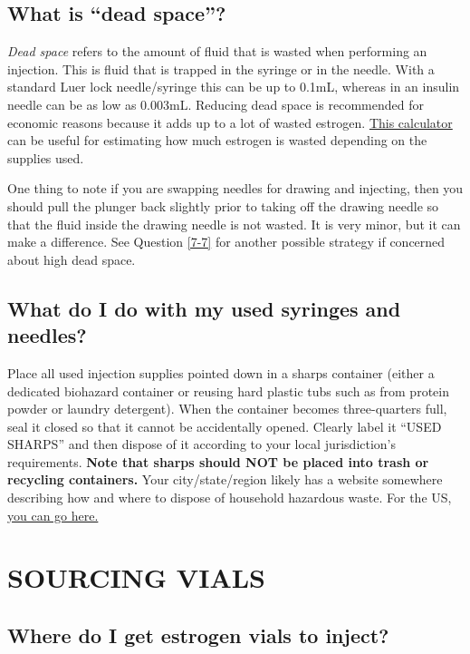 \documentclass{article}
\begin{document}
\subsection{What is “dead space”?}\label{5-26}

\textit{Dead space} refers to the amount of fluid that is wasted when performing an injection. This is fluid that is trapped in the syringe or in the needle. With a standard Luer lock needle/syringe this can be up to 0.1mL, whereas in an insulin needle can be as low as 0.003mL. Reducing dead space is recommended for economic reasons because it adds up to a lot of wasted estrogen. \href{https://hrtcafe.net/Calc/}{This calculator} can be useful for estimating how much estrogen is wasted depending on the supplies used.

One thing to note if you are swapping needles for drawing and injecting, then you should pull the plunger back slightly prior to taking off the drawing needle so that the fluid inside the drawing needle is not wasted. It is very minor, but it can make a difference. See Question \ref{7-7} for another possible strategy if concerned about high dead space.

\subsection{What do I do with my used syringes and needles?}\label{5-27}

Place all used injection supplies pointed down in a sharps container (either a dedicated biohazard container or reusing hard plastic tubs such as from protein powder or laundry detergent). When the container becomes three-quarters full, seal it closed so that it cannot be accidentally opened. Clearly label it “USED SHARPS” and then dispose of it according to your local jurisdiction's requirements. \textbf{Note that sharps should NOT be placed into trash or recycling containers.} Your city/state/region likely has a website somewhere describing how and where to dispose of household hazardous waste. For the US, \href{https://safeneedledisposal.org/}{you can go here.}



\section{SOURCING VIALS}\label{sv}

\subsection{Where do I get estrogen vials to inject?}
\end{document}
